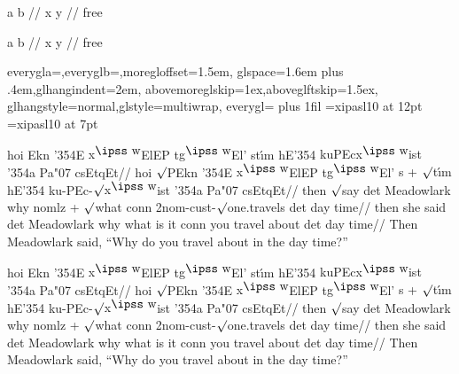 

\ex[glstyle=multiwrap]
\begingl
\gla a b //
\glb x y //
\glft free
\endgl
\xe

\begingl [A]\quad
\gla a b //
\glb x y //
\glft free
\endgl

%
   {everygla=\ips,everyglb=\ips,moregloffset=1.5em,
   glspace=1.6em plus .4em,glhangindent=2em,
   abovemoreglskip=1ex,aboveglftskip=1.5ex,
   glhangstyle=normal,glstyle=multiwrap,
   everygl={\rightskip=0pt plus 1fil}}
\font\ips=xipasl10 at 12pt
\font\ipss=xipasl10 at 7pt
\def\mroot{$\surd$}
\def\L{\char'354}
\def\v#1{{\accent"07 #1}}
\def\C{{\accent"07 c}}
\def\W{$^{\hbox{\ipss w}}\mskip-2mu$}

\hsize=4in

\ex[lingstyle=ips-gloss]
\begingl
\gla hoi Ekn {\L}E {x\W}ElEP t{g\W}El' st{\'\i}m
   {hE\L} {kuPEcx\W ist} {\L a} Pa{\v c}sEtqEt//
\glb hoi {\mroot}PEkn {\L}E {x\W}ElEP t{g\W}El' {s + \mroot t\'\i m}
   {hE\L} ku-PEc-\mroot{x\W}ist {\L}a Pa{\v c}sEtqEt//
\glc then {\mroot}say det Meadowlark why
      {nomlz + \mroot what} conn
   2nom-cust-{\mroot}one.travels det {day time}//
\glc then {she said} det Meadowlark why {what is it}
   conn {you travel about} det {day time}//
\glft Then Meadowlark said, ``Why do you travel about in the day
time?''
\endgl
\xe

\ex[lingstyle=ips-gloss,glhangstyle=cascade]
\begingl
\gla hoi Ekn {\L}E {x\W}ElEP t{g\W}El' st{\'\i}m
   {hE\L} {kuPEcx\W ist} {\L a} Pa{\v c}sEtqEt//
\glb hoi {\mroot}PEkn {\L}E {x\W}ElEP t{g\W}El' {s + \mroot t\'\i m}
   {hE\L} ku-PEc-\mroot{x\W}ist {\L}a Pa{\v c}sEtqEt//
\glc then {\mroot}say det Meadowlark why
      {nomlz + \mroot what} conn
   2nom-cust-{\mroot}one.travels det {day time}//
\glc then {she said} det Meadowlark why {what is it}
   conn {you travel about} det {day time}//
\glft Then Meadowlark said, ``Why do you travel about in the day
time?''
\endgl
\xe

